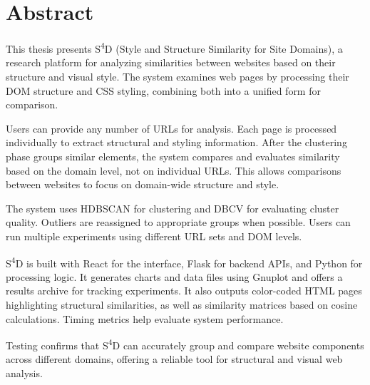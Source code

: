 \newpage
{}
\chapter*{Abstract}

This thesis presents S\textsuperscript{4}D (Style and Structure Similarity for Site Domains), a research platform for analyzing similarities between websites based on their structure and visual style. The system examines web pages by processing their DOM structure and CSS styling, combining both into a unified form for comparison.

Users can provide any number of URLs for analysis. Each page is processed individually to extract structural and styling information. After the clustering phase groups similar elements, the system compares and evaluates similarity based on the domain level, not on individual URLs. This allows comparisons between websites to focus on domain-wide structure and style.

The system uses HDBSCAN for clustering and DBCV for evaluating cluster quality. Outliers are reassigned to appropriate groups when possible. Users can run multiple experiments using different URL sets and DOM levels.

S\textsuperscript{4}D is built with React for the interface, Flask for backend APIs, and Python for processing logic. It generates charts and data files using Gnuplot and offers a results archive for tracking experiments. It also outputs color-coded HTML pages highlighting structural similarities, as well as similarity matrices based on cosine calculations. Timing metrics help evaluate system performance.

Testing confirms that S\textsuperscript{4}D can accurately group and compare website components across different domains, offering a reliable tool for structural and visual web analysis.

